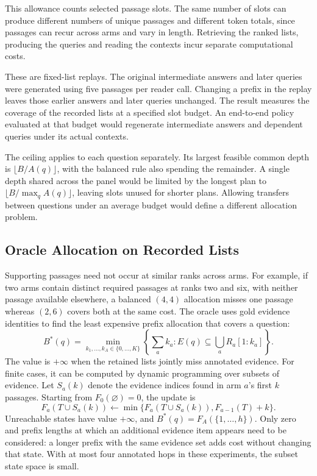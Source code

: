 This allowance counts selected passage slots. The same number of slots can produce
different numbers of unique passages and different token totals, since passages
can recur across arms and vary in length. Retrieving the ranked lists, producing
the queries and reading the contexts incur separate computational costs.

These are fixed-list replays. The original intermediate answers and later
queries were generated using five passages per reader call. Changing a prefix
in the replay leaves those earlier answers and later queries unchanged. The
result measures the coverage of the recorded lists at a specified slot budget.
An end-to-end policy evaluated at that budget would regenerate intermediate
answers and dependent queries under its actual contexts.

The ceiling applies to each question separately. Its largest feasible common
depth is $\lfloor B/A(q)\rfloor$, with the balanced rule also spending the
remainder. A single depth shared across the panel would be limited by the
longest plan to $\lfloor B/\max_q A(q)\rfloor$, leaving slots unused for
shorter plans. Allowing transfers between questions under an average budget
would define a different allocation problem.

\subsection{Oracle Allocation on Recorded Lists}

Supporting passages need not occur at similar ranks across arms. For example,
if two arms contain distinct required passages at ranks two and six, with
neither passage available elsewhere, a balanced $(4,4)$ allocation misses
one passage whereas $(2,6)$ covers both at the same cost. The oracle uses
gold evidence identities to find the least expensive prefix allocation that
covers a question:
\begin{equation}
  B^*(q)=
  \min_{k_1,\ldots,k_A\in\{0,\ldots,K\}}
  \left\{\sum_a k_a:
    E(q)\subseteq\bigcup_a R_a[1:k_a]
  \right\}.
  \label{eq:ch4-oracle-budget}
\end{equation}
The value is $+\infty$ when the retained lists jointly miss annotated
evidence. For finite cases, it can be computed by dynamic programming over
subsets of evidence. Let $S_a(k)$ denote the evidence indices found in arm
$a$'s first $k$ passages. Starting from $F_0(\varnothing)=0$, the update is
\begin{equation}
  F_a(T\cup S_a(k))
  \leftarrow
  \min\{F_a(T\cup S_a(k)),F_{a-1}(T)+k\}.
  \label{eq:ch4-dynamic-program}
\end{equation}
Unreachable states have value $+\infty$, and
$B^*(q)=F_A(\{1,\ldots,h\})$. Only zero and prefix lengths at which an
additional evidence item appears need to be considered: a longer prefix with
the same evidence set adds cost without changing that state. With at most
four annotated hops in these experiments, the subset state space is small.


